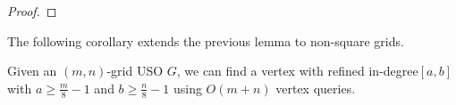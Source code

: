 \documentclass[runningheads,a4paper]{llncs}
\newcommand{\MM}[1]{\marginpar{\parbox{3.6cm}{{\small {\bf MM:} #1}}}} %
\newcommand{\indegree}{refined in-degree\xspace}
\begin{document}
\begin{proof}
\end{proof}

The following corollary extends the previous lemma to non-square grids.

\begin{corollary}\label{corollary: n/4 indegree}
  Given an $(m,n)$-grid USO $G$, we can find a vertex with \indegree $[a,b]$ with $a \geq \frac{m}{8} - 1$ and  $b \geq \frac{n}{8} - 1$ using $O(m+n)$ vertex queries.
\end{corollary} 
\end{document}
